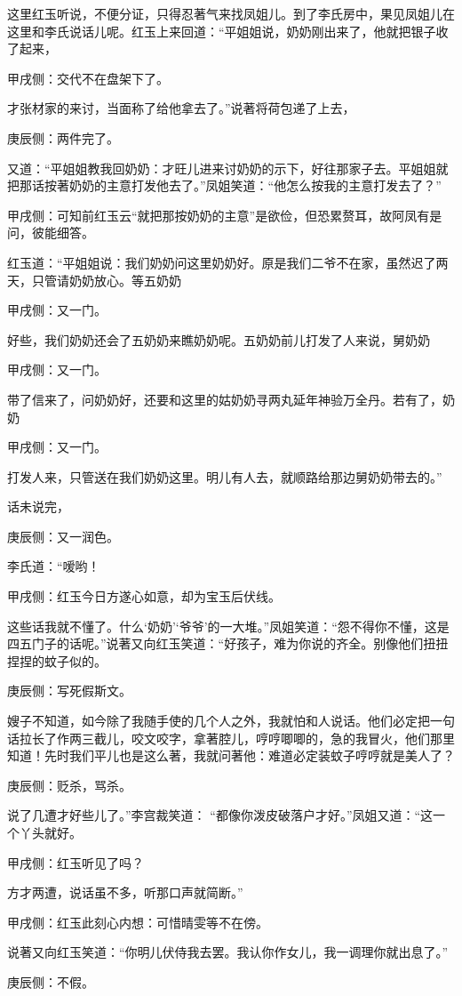\begin{parag}
    这里红玉听说，不便分证，只得忍著气来找凤姐儿。到了李氏房中，果见凤姐儿在这里和李氏说话儿呢。红玉上来回道：“平姐姐说，奶奶刚出来了，他就把银子收了起来，\begin{note}甲戌侧：交代不在盘架下了。\end{note}才张材家的来讨，当面称了给他拿去了。”说著将荷包递了上去，\begin{note}庚辰侧：两件完了。\end{note}又道：“平姐姐教我回奶奶：才旺儿进来讨奶奶的示下，好往那家子去。平姐姐就把那话按著奶奶的主意打发他去了。”凤姐笑道：“他怎么按我的主意打发去了？”\begin{note}甲戌侧：可知前红玉云“就把那按奶奶的主意”是欲俭，但恐累赘耳，故阿凤有是问，彼能细答。\end{note}红玉道：“平姐姐说：我们奶奶问这里奶奶好。原是我们二爷不在家，虽然迟了两天，只管请奶奶放心。等五奶奶\begin{note}甲戌侧：又一门。\end{note}好些，我们奶奶还会了五奶奶来瞧奶奶呢。五奶奶前儿打发了人来说，舅奶奶\begin{note}甲戌侧：又一门。\end{note}带了信来了，问奶奶好，还要和这里的姑奶奶寻两丸延年神验万全丹。若有了，奶奶\begin{note}甲戌侧：又一门。\end{note}打发人来，只管送在我们奶奶这里。明儿有人去，就顺路给那边舅奶奶带去的。”
\end{parag}


\begin{parag}
    话未说完，\begin{note}庚辰侧：又一润色。\end{note}李氏道：“嗳哟！\begin{note}甲戌侧：红玉今日方遂心如意，却为宝玉后伏线。\end{note}这些话我就不懂了。什么‘奶奶’‘爷爷’的一大堆。”凤姐笑道：“怨不得你不懂，这是四五门子的话呢。”说著又向红玉笑道：“好孩子，难为你说的齐全。别像他们扭扭捏捏的蚊子似的。\begin{note}庚辰侧：写死假斯文。\end{note}嫂子不知道，如今除了我随手使的几个人之外，我就怕和人说话。他们必定把一句话拉长了作两三截儿，咬文咬字，拿著腔儿，哼哼唧唧的，急的我冒火，他们那里知道！先时我们平儿也是这么著，我就问著他：难道必定装蚊子哼哼就是美人了？\begin{note}庚辰侧：贬杀，骂杀。\end{note}说了几遭才好些儿了。”李宫裁笑道： “都像你泼皮破落户才好。”凤姐又道：“这一个丫头就好。\begin{note}甲戌侧：红玉听见了吗？\end{note}方才两遭，说话虽不多，听那口声就简断。”\begin{note}甲戌侧：红玉此刻心内想：可惜晴雯等不在傍。\end{note}说著又向红玉笑道：“你明儿伏侍我去罢。我认你作女儿，我一调理你就出息了。”\begin{note}庚辰侧：不假。\end{note}
\end{parag}


